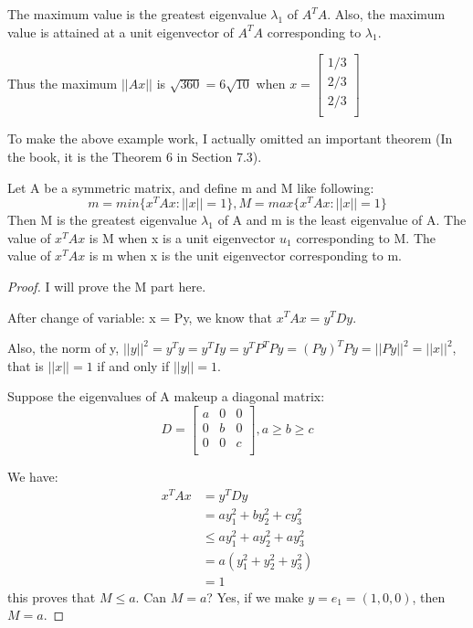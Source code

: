 \begin{eg}
    The maximum value is the greatest eigenvalue \(\lambda_1\) of \(A^TA\). Also, the maximum value is attained at a unit eigenvector of \(A^TA\) corresponding to \(\lambda_1\).   

    Thus the maximum \(||Ax||\) is \(\sqrt{360} = 6\sqrt{10}\) when \(x = \begin{bmatrix}
         1/3 \\
         2/3 \\
         2/3 \\
    \end{bmatrix}\)  
\end{eg}

To make the above example work, I actually omitted an important theorem (In the book, it is the Theorem 6 in Section 7.3).
    
\begin{theorem}
    Let A be a symmetric matrix, and define m and M like following:
    \[
        m = min\{x^TAx: ||x|| = 1\}, M = max\{x^TAx: ||x|| = 1\}
    \]
    Then M is the greatest eigenvalue \(\lambda_1\) of A and m is the least eigenvalue of A. 
    The value of \(x^TAx\) is M when x is a unit eigenvector \(u_1\) corresponding to M. The value of \(x^TAx\) is m when x is the unit eigenvector corresponding to m.   
\end{theorem}
\begin{proof}
    I will prove the M part here.

    After change of variable: x = Py, we know that \(x^TAx = y^TDy\). 

    Also, the norm of y, \(||y||^2 = y^Ty = y^TIy = y^TP^TPy = (Py)^TPy = ||Py||^2 = ||x||^2\), that is \(||x|| = 1\) if and only if \(||y|| = 1\).   

    Suppose the eigenvalues of A makeup a diagonal matrix:
    \[
        D = \begin{bmatrix}
            a & 0 & 0 \\
            0 & b & 0  \\
            0 & 0 & c \\
        \end{bmatrix}, a \geq b \geq c
    \]

    We have:
    \begin{align*}
        x^TAx &= y^TDy \\
            &= ay_1^2 + by_2^2 + cy_3^2 \\
            &\leq ay_1^2 + ay_2^2 + ay_3^2 \\
            &= a(y_1^2 + y_2^2 + y_3^2) \\
            &= 1
    \end{align*}
    this proves that \(M \leq a\). Can \(M = a\)? Yes, if we make \(y = e_1 = (1, 0, 0)\), then \(M = a\).  
\end{proof}


